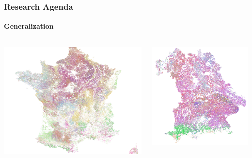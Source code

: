 \documentclass[%
  aspectratio=169,
  9pt,
  USenglish,
  titlegraphic, %
  affiliationintitlepagehead,
  progressbar,
]{beamer}
\begin{document}
\begin{frame}

\frametitle{Research Agenda}
\framesubtitle{Generalization}

\begin{columns}
	
	\includegraphics[width=.9\textwidth]{images/France}
	
	
	\includegraphics[width=.8\textwidth]{images/Bavaria}
\end{columns}

\end{frame}
\end{document}
